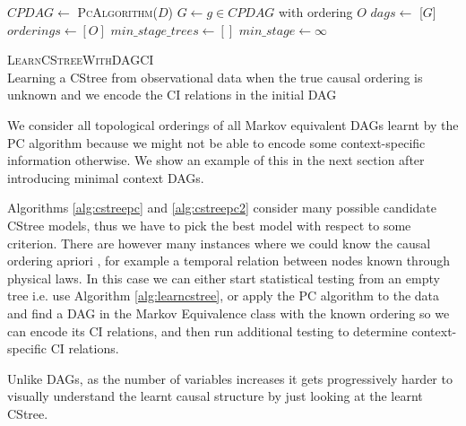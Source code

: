 \documentclass{tufte-book}
\begin{document}
\begin{algorithm}\label{alg:cstreepc2}
\SetAlgoLined
{}
$CPDAG \gets$ \textsc{PcAlgorithm}($D$)\;
{
$G \gets g \in CPDAG$ with ordering $O$\;
$dags \gets$ [$G$]\;
$orderings \gets [O]$\;
}
$min\_stage\_trees \gets []$\;
$min\_stage \gets \infty$\;
\caption{\textsc{LearnCStreeWithDAGCI} \\ Learning a CStree from observational data when the true causal ordering is unknown and we encode the CI relations in the initial DAG}

\end{algorithm}




We consider all topological orderings of all Markov equivalent DAGs learnt by the PC algorithm because we might not be able to encode some context-specific information otherwise. We show an example of this in the next section after introducing minimal context DAGs.

Algorithms \ref{alg:cstreepc} and \ref{alg:cstreepc2} consider many possible candidate CStree models, thus we have to pick the best model with respect to some criterion. There are however many instances where we could know the causal ordering apriori \cite{thwaites-2010-causal-analy,silander-2013}, for example a temporal relation between nodes known through physical laws. In this case we can either start statistical testing from an empty tree i.e. use Algorithm \ref{alg:learncstree}, or apply the PC algorithm to the data and find a DAG in the Markov Equivalence class with the known ordering so we can encode its CI relations, and then run additional testing to determine context-specific CI relations.



Unlike DAGs, as the number of variables increases it gets progressively harder to visually understand the learnt causal structure by just looking at the learnt CStree.
\end{document}
